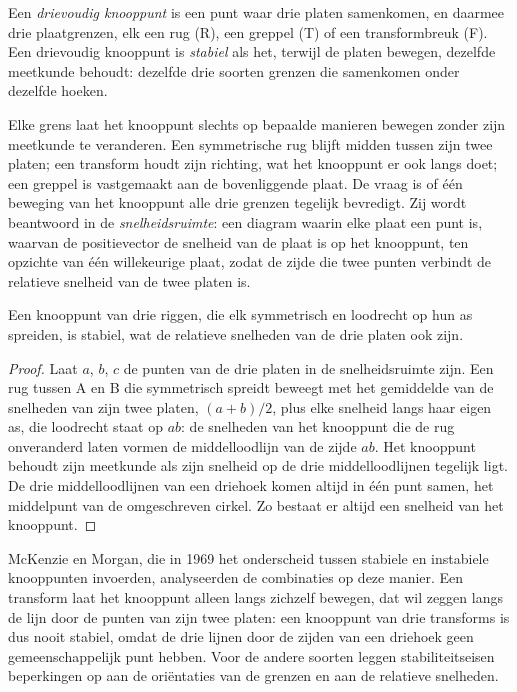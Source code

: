 \begin{definition}\label{def:b1:plate-kinematics:triple-junction}
Een \emph{drievoudig knooppunt} is een punt waar drie platen samenkomen, en daarmee drie plaatgrenzen, elk een rug (R), een greppel (T) of een transformbreuk (F). Een drievoudig knooppunt is \emph{stabiel} als het, terwijl de platen bewegen, dezelfde meetkunde behoudt: dezelfde drie soorten grenzen die samenkomen onder dezelfde hoeken.
\end{definition}

Elke grens laat het knooppunt slechts op bepaalde manieren bewegen zonder zijn meetkunde te veranderen. Een symmetrische rug blijft midden tussen zijn twee platen; een transform houdt zijn richting, wat het knooppunt er ook langs doet; een greppel is vastgemaakt aan de bovenliggende plaat. De vraag is of één beweging van het knooppunt alle drie grenzen tegelijk bevredigt. Zij wordt beantwoord in de \emph{snelheidsruimte}: een diagram waarin elke plaat een punt is, waarvan de positievector de snelheid van de plaat is op het knooppunt, ten opzichte van één willekeurige plaat, zodat de zijde die twee punten verbindt de relatieve snelheid van de twee platen is.

\begin{proposition}\label{prop:b1:plate-kinematics:rrr}
Een knooppunt van drie riggen, die elk symmetrisch en loodrecht op hun as spreiden, is stabiel, wat de relatieve snelheden van de drie platen ook zijn.
\end{proposition}

\begin{proof}
Laat $a$, $b$, $c$ de punten van de drie platen in de snelheidsruimte zijn. Een rug tussen A en B die symmetrisch spreidt beweegt met het gemiddelde van de snelheden van zijn twee platen, $(a + b)/2$, plus elke snelheid langs haar eigen as, die loodrecht staat op $ab$: de snelheden van het knooppunt die de rug onveranderd laten vormen de middelloodlijn van de zijde $ab$. Het knooppunt behoudt zijn meetkunde als zijn snelheid op de drie middelloodlijnen tegelijk ligt. De drie middelloodlijnen van een driehoek komen altijd in één punt samen, het middelpunt van de omgeschreven cirkel. Zo bestaat er altijd een snelheid van het knooppunt.
\end{proof}

McKenzie en Morgan, die in 1969 het onderscheid tussen stabiele en instabiele knooppunten invoerden, analyseerden de combinaties op deze manier. Een transform laat het knooppunt alleen langs zichzelf bewegen, dat wil zeggen langs de lijn door de punten van zijn twee platen: een knooppunt van drie transforms is dus nooit stabiel, omdat de drie lijnen door de zijden van een driehoek geen gemeenschappelijk punt hebben. Voor de andere soorten leggen stabiliteitseisen beperkingen op aan de oriëntaties van de grenzen en aan de relatieve snelheden.


